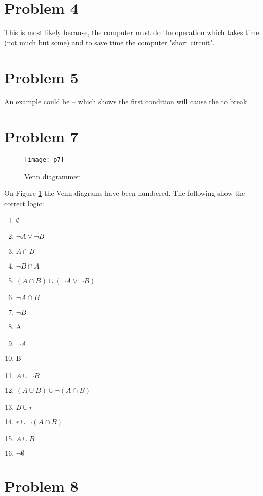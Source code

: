 \documentclass[english,10pt,a4paper]{article}
\begin{document}
\section*{Problem 4}
This is most likely because, the computer must do the operation which takes time (not much but some) and to save time the computer "short circuit".


\section*{Problem 5}
An example could be  -- which shows the first condition will cause the  to break.



\newpage
\section*{Problem 7}
\begin{figure}[hbtp]
\centering
\texttt{[image: p7]}
\caption{Venn diagrammer}
\label{fig:venn}
\end{figure}
On Figure \ref{fig:venn} the Venn diagrams have been numbered.
The following show the correct logic:
\begin{enumerate}
\item $\emptyset$
\item $\neg A \vee \neg B$
\item $A \cap B$
\item $\neg B \cap A$
\item $(A \cap B) \cup ( \neg A \vee \neg B)$
\item $\neg A \cap B$
\item $\neg B$
\item A
\item $\neg A$
\item B
\item $A \cup \neg B$
\item $(A \cup B) \cup \neg (A \cap B)$
\item $B \cup r$
\item $r \cup \neg(A\cap B)$
\item $A\cup B $
\item $\neg \emptyset$
\end{enumerate}


\newpage
\section*{Problem 8}
\end{document}
